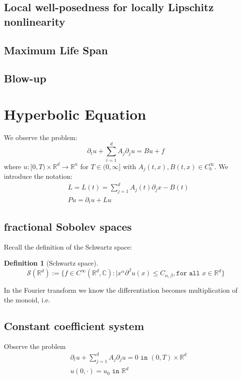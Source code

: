 \documentclass[a4paper,11pt,oneside,fleqn]{book}
\theoremstyle{definition}
\newtheorem{definition}{Definition}[section]
\theoremstyle{remark}
\begin{document}
\subsection{Local well-posedness for locally Lipschitz nonlinearity}


\subsection{Maximum Life Span}


\subsection{Blow-up}



\section{Hyperbolic Equation}
We observe the problem:
\begin{equation}
	\partial_t u + \sum_{i = 1}^d A_j \partial_j u = B u + f
\end{equation}
where $u:[0, T) \times \mathbb{R}^d \rightarrow \mathbb{R}^n$ for $T \in (0, \infty]$ with $A_j(t, x), B(t, x) \in C_b^\infty$. We introduce the notation:
\begin{align*}
	&L = L(t) = \sum_{j = 1}^d A_j(t) \partial_j x - B(t)\\
	&Pu = \partial_t u + Lu
\end{align*}


\subsection{fractional Sobolev spaces}
Recall the definition of the Schwartz space:
\begin{definition}[Schwartz space]
\begin{equation}
	\mathcal{S}(\mathbb{R}^d):= \{ f \in C^\infty(\mathbb{R}^d, \mathbb{C}): |x^\alpha \partial^\beta u(x) \le C_{\alpha, \beta}, \texttt{for all } x \in \mathbb{R}^d\}	
\end{equation}
\end{definition}

In the Fourier transform we know the differentiation becomes multiplication of the monoid, i.e.


\subsection{Constant coefficient system}
Observe the problem
\begin{align*}
	& \partial_t u + \sum_{ j = 1}^d A_j \partial_j u = 0 \texttt{ in } (0, T) \times \mathbb{R}^d\\
	& u(0, \cdot) = u_0 \texttt{ in } \mathbb{R}^d
\end{align*}
\end{document}
